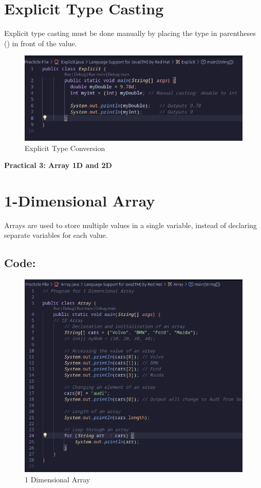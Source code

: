 \documentclass[a4paper,12pt]{article}
\newcommand{\practicaltitle}[1]{
    \newpage
    \begin{center}
        \Large\textbf{#1} \\
        \normalsize\vspace{0.5cm}
    \end{center}
}
\begin{document}
\section{Explicit Type Casting}
Explicit type casting must be done manually by placing the type in parentheses () in front of the value.
\begin{center}
\end{center}
\begin{figure}[H]
    \centering
    \includegraphics[width=0.9\linewidth]{images/explicit.png}
    \caption{Explicit Type Conversion}
    \label{fig:sample_image}
\end{figure}

\setcounter{section}{0}

\practicaltitle{Practical 3: Array 1D and 2D}

\section{1-Dimensional Array}
Arrays are used to store multiple values in a single variable, instead of declaring separate variables for each value.
\subsection{Code: }
\begin{figure}[H]
    \centering
    \includegraphics[width=0.8\linewidth]{images/array.png}
    \caption{1 Dimensional Array}
    \label{fig:sample_image}
\end{figure}
\end{document}
